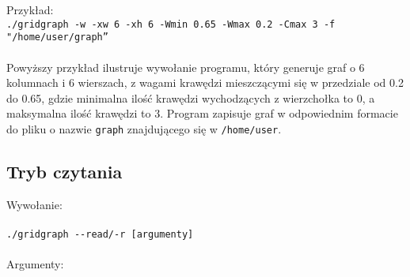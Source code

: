 \documentclass[11pt,a4paper]{report}
\begin{document}
    Przykład:\\
    \verb|./gridgraph -w -xw 6 -xh 6 -Wmin 0.65 -Wmax 0.2 -Cmax 3 -f "/home/user/graph”|
    \\
    \\
    Powyższy przykład ilustruje wywołanie programu, który generuje graf o 6 kolumnach i 6 wierszach, z wagami krawędzi mieszczącymi się w przedziale od 0.2 do 0.65, gdzie minimalna ilość krawędzi wychodzących z wierzchołka to 0, a maksymalna ilość krawędzi to 3. Program zapisuje graf w odpowiednim formacie do pliku o nazwie \verb|graph| znajdującego się w \verb|/home/user|.
    \subsection{Tryb czytania}
    Wywołanie:\\
    \\
    \verb|./gridgraph --read/-r [argumenty]|\\
    \\
    Argumenty:
\end{document}
